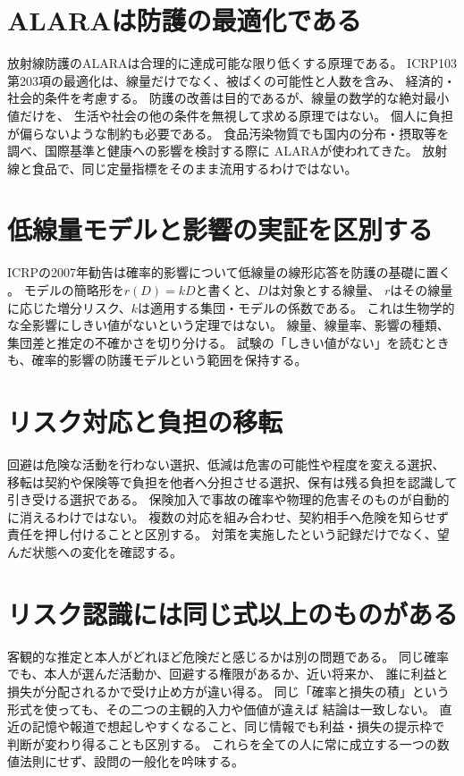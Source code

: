 \section{ALARAは防護の最適化である}
\label{theory:safety:alara}
放射線防護のALARAは合理的に達成可能な限り低くする原理である。
ICRP103第203項の最適化は、線量だけでなく、被ばくの可能性と人数を含み、
経済的・社会的条件を考慮する\cite{saf_icrpaedia}。
防護の改善は目的であるが、線量の数学的な絶対最小値だけを、
生活や社会の他の条件を無視して求める原理ではない。
個人に負担が偏らないような制約も必要である。
食品汚染物質でも国内の分布・摂取等を調べ、国際基準と健康への影響を検討する際に
ALARAが使われてきた\cite{saf_food2023}。
放射線と食品で、同じ定量指標をそのまま流用するわけではない。

\section{低線量モデルと影響の実証を区別する}
ICRPの2007年勧告は確率的影響について低線量の線形応答を防護の基礎に置く
\cite{saf_icrp103}。
モデルの簡略形を\(r(D)=kD\)と書くと、\(D\)は対象とする線量、
\(r\)はその線量に応じた増分リスク、\(k\)は適用する集団・モデルの係数である。
これは生物学的な全影響にしきい値がないという定理ではない。
線量、線量率、影響の種類、集団差と推定の不確かさを切り分ける。
試験の「しきい値がない」を読むときも、確率的影響の防護モデルという範囲を保持する。

\section{リスク対応と負担の移転}
\label{theory:safety:response}
回避は危険な活動を行わない選択、低減は危害の可能性や程度を変える選択、
移転は契約や保険等で負担を他者へ分担させる選択、保有は残る負担を認識して引き受ける選択である。
保険加入で事故の確率や物理的危害そのものが自動的に消えるわけではない。
複数の対応を組み合わせ、契約相手へ危険を知らせず責任を押し付けることと区別する。
対策を実施したという記録だけでなく、望んだ状態への変化を確認する。

\section{リスク認識には同じ式以上のものがある}
\label{theory:safety:perception}
客観的な推定と本人がどれほど危険だと感じるかは別の問題である。
同じ確率でも、本人が選んだ活動か、回避する権限があるか、近い将来か、
誰に利益と損失が分配されるかで受け止め方が違い得る。
同じ「確率と損失の積」という形式を使っても、その二つの主観的入力や価値が違えば
結論は一致しない。
直近の記憶や報道で想起しやすくなること、同じ情報でも利益・損失の提示枠で
判断が変わり得ることも区別する。
これらを全ての人に常に成立する一つの数値法則にせず、設問の一般化を吟味する。

